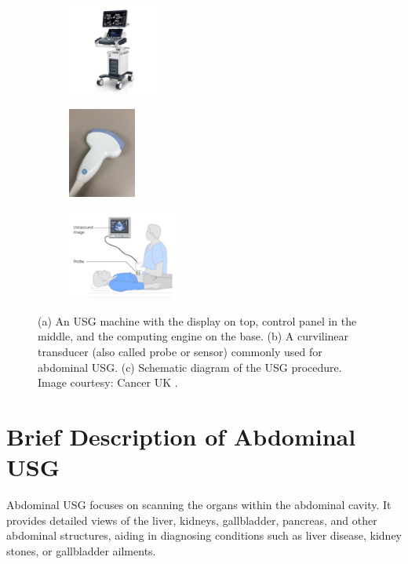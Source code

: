 \begin{figure}[!t]
\centering
    \begin{subfigure}[b]{0.32\linewidth}
    \includegraphics[width=\linewidth, height=8em]{figs/usg_machine.jpg}
    \caption{}
    \label{fig:usg_machine}
    \end{subfigure}
    \begin{subfigure}[b]{0.24\linewidth}	
    \includegraphics[width=\linewidth, height=8em]{figs/transducer.jpg}
    \caption{}
    \label{fig:usg_probe}
    \end{subfigure}
    \begin{subfigure}[b]{0.32\linewidth}	
    \includegraphics[width=\linewidth, height=8em]{figs/usg_overall.png}
    \caption{}
    \label{fig:usg_diag}
    \end{subfigure}
    \caption[Ultrasound machine, probe, and schematic diagram of abdominal USG]{(a) An USG machine with the display on top, control panel in the middle, and the computing engine on the base. (b) A curvilinear transducer (also called probe or sensor) commonly used for abdominal USG. (c) Schematic diagram of the USG procedure. Image courtesy: Cancer UK \cite{usg_diag}.}
    \label{fig:sample_usg}
\end{figure}

\section{Brief Description of Abdominal USG}
%
Abdominal USG focuses on scanning the organs within the abdominal cavity. It provides detailed views of the liver, kidneys, gallbladder, pancreas, and other abdominal structures, aiding in diagnosing conditions such as liver disease, kidney stones, or gallbladder ailments.

